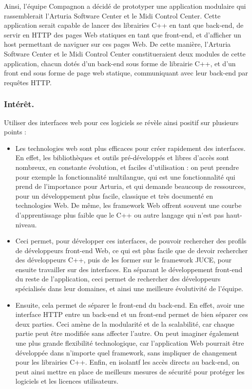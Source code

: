 \documentclass[francais]{rapportPFE}  %
\begin{document}
Ainsi, l'équipe Compagnon a décidé de prototyper une application modulaire qui rassemblerait l'Arturia Software Center et le Midi Control Center. Cette application serait capable de lancer des librairies C++ en tant que back-end, de servir en HTTP des pages Web statiques en tant que front-end, et d'afficher un host permettant de naviguer sur ces pages Web. De cette manière, l'Arturia Software Center et le Midi Control Center constitueraient deux modules de cette application, chacun dotés d'un back-end sous forme de librairie C++, et d'un front end sous forme de page web statique, communiquant avec leur back-end par requêtes HTTP.\\

\subsubsection{Intérêt.}

Utiliser des interfaces web pour ces logiciels se révèle ainsi positif sur plusieurs points : 
\begin{itemize}
	\item Les technologies web sont plus efficaces pour créer rapidement des interfaces. En effet, les bibliothèques et outils pré-développés et libres d'accès sont nombreux, en constante évolution, et faciles d'utilisation : on peut prendre pour exemple la fonctionnalité multilangue, qui est une fonctionnalité qui prend de l'importance pour Arturia, et qui demande beaucoup de ressources, pour un développement plus facile, classique et très documenté en technologies Web. De même, les framework Web offrent souvent une courbe d'apprentissage plus faible que le C++ ou autre langage qui n'est pas haut-niveau.
	\item Ceci permet, pour développer ces interfaces, de pouvoir rechercher des profils de développeurs front-end Web, ce qui est plus facile que de devoir rechercher des développeurs C++, puis de les former sur le framework JUCE, pour ensuite travailler sur des interfaces. En séparant le développement front-end du reste de l'application, ceci permet de rechercher des développeurs spécialisés dans leur domaines, et ainsi une meilleure évolutivité de l'équipe.
	\item Ensuite, cela permet de séparer le front-end du back-end. En effet, avoir une interface HTTP entre un back-end et un front-end permet de bien séparer ces deux parties. Ceci amène de la modularité et de la scalabilité, car chaque partie peut être modifiée sans affecter l'autre. On peut imaginer également une plus grande flexibilité technologique, car l'application Web pourrait être développée dans n'importe quel framework, sans impliquer de changement pour les librairies C++. Enfin, en isolantf les accès directs au back-end, on peut ainsi mettre en place de meilleurs mesures de sécurité pour protéger les logiciels et les licences utilisateurs.
\end{itemize}
\end{document}
